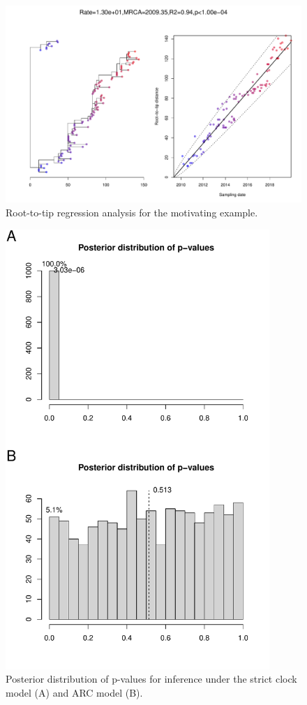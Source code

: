 \documentclass{article}
\begin{document}
\begin{figure}[t!]
\begin{center}
\includegraphics[width=15cm]{exampleS1.pdf}
\end{center}
\caption{Root-to-tip regression analysis for the motivating example.
\label{fig:exampleS1}}
\end{figure}

\begin{figure}[t!]
\begin{center}
\includegraphics[width=10cm]{exampleS2.pdf}
\end{center}
\caption{Posterior distribution of p-values for inference under the strict clock model (A) and ARC model (B).
\label{fig:exampleS2}}
\end{figure}
\end{document}
